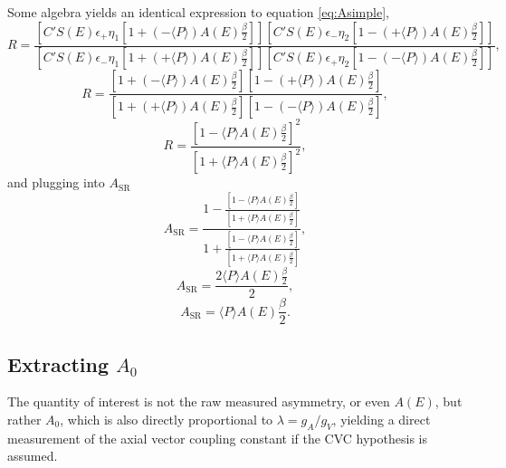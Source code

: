 Some algebra yields an identical expression to equation \ref{eq:Asimple},
%
\begin{equation*}
R = \frac{ \left[ C'  S(E)  \epsilon_{+}  \eta_{1} \left[ 1 + 
      \left(- \langle P \rangle \right)  A(E) \frac{\beta}{2} \right] \right] 
\left[ C'  S(E)  \epsilon_{-}  \eta_{2} \left[ 1 - 
    \left(+ \langle P \rangle \right)  A(E) \frac{\beta}{2} \right] \right] }
{ \left[ C'  S(E)  \epsilon_{-}  \eta_{1} \left[ 1 + 
      \left(+ \langle P \rangle \right)  A(E) \frac{\beta}{2} \right] \right] 
\left[ C'  S(E)  \epsilon_{+}  \eta_{2} \left[ 1 - 
    \left(- \langle P \rangle \right)  A(E) \frac{\beta}{2} \right] \right] },
\end{equation*}
%
\begin{equation*}
R = \frac{ \left[ 1 + \left(- \langle P \rangle \right)  A(E) \frac{\beta}{2} \right] 
\left[ 1 - \left(+ \langle P \rangle \right)  A(E) \frac{\beta}{2} \right]  }
{  \left[ 1 +  \left(+ \langle P \rangle \right)  A(E) \frac{\beta}{2}  \right] 
 \left[ 1 -  \left(- \langle P \rangle \right)  A(E) \frac{\beta}{2} \right]},
\end{equation*}
%
\begin{equation*}
R = \frac{ \left[ 1 -  \langle P \rangle  A(E) \frac{\beta}{2} \right]^2 }
{  \left[ 1 + \langle P \rangle  A(E) \frac{\beta}{2}  \right]^2 },
\end{equation*}
%
\noindent and plugging into $A_{\mathrm{SR}}$
%
\begin{equation*}
  A_{\mathrm{SR}} = \frac{1-\frac{ \left[ 1 -  \langle P \rangle  A(E) \frac{\beta}{2} \right] }
{  \left[ 1 + \langle P \rangle  A(E) \frac{\beta}{2}  \right] } }
  {1+\frac{ \left[ 1 -  \langle P \rangle  A(E) \frac{\beta}{2} \right] }
{  \left[ 1 + \langle P \rangle  A(E) \frac{\beta}{2}  \right] }},
\end{equation*}
%
\begin{equation*}
A_{\mathrm{SR}} = \frac{2 \langle P \rangle A(E) \frac{\beta}{2}}{2},
\end{equation*}
%
\begin{equation} \label{eq:A_SR}
A_{\mathrm{SR}} = \langle P \rangle A(E) \frac{\beta}{2}.
\end{equation}

\subsection{Extracting $A_0$}

The quantity of interest is not the raw measured asymmetry, or even $A(E)$,
but rather $A_0$, which is also directly proportional to $\lambda=g_A/g_V$, yielding a direct 
measurement of the axial vector coupling constant if the CVC hypothesis is assumed. 

